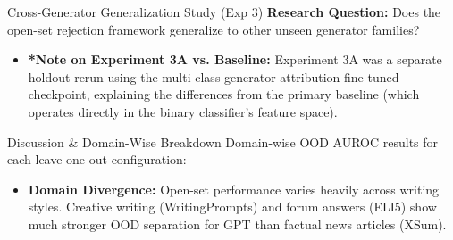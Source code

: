 \documentclass[aspectratio=169]{beamer}
\begin{document}
\begin{frame}{Cross-Generator Generalization Study (Exp 3)}
\textbf{Research Question:} Does the open-set rejection framework generalize to other unseen generator families?
\centering
{}
\begin{itemize}
    \item \scriptsize{\textbf{*Note on Experiment 3A vs. Baseline:} Experiment 3A was a separate holdout rerun using the multi-class generator-attribution fine-tuned checkpoint, explaining the differences from the primary baseline (which operates directly in the binary classifier's feature space).}
\end{itemize}
\end{frame}

\begin{frame}{Discussion \& Domain-Wise Breakdown}
Domain-wise OOD AUROC results for each leave-one-out configuration:
\centering
{}
\begin{itemize}
    \item \textbf{Domain Divergence:} Open-set performance varies heavily across writing styles. Creative writing (WritingPrompts) and forum answers (ELI5) show much stronger OOD separation for GPT than factual news articles (XSum).
\end{itemize}
\end{frame}
\end{document}
